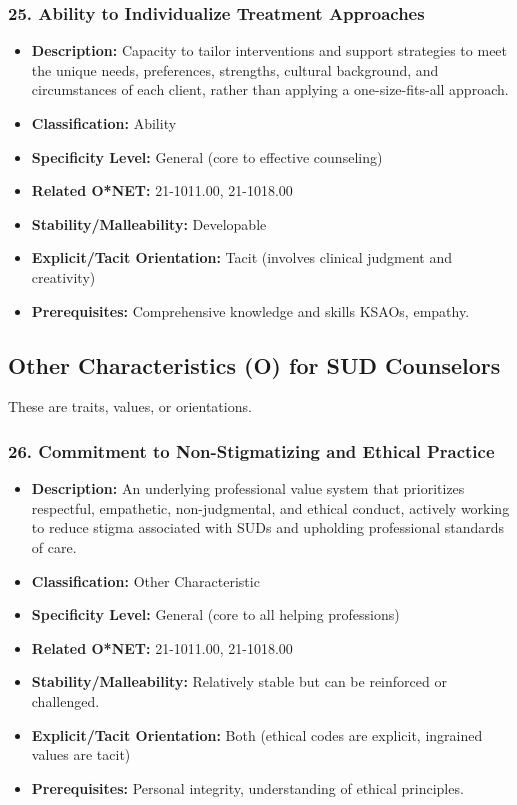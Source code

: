 \documentclass[
  letterpaper,
  DIV=11,
  numbers=noendperiod]{scrartcl}
\providecommand{\tightlist}{%
  \setlength{\itemsep}{0pt}\setlength{\parskip}{0pt}}
\begin{document}
\subsubsection{25. Ability to Individualize Treatment
Approaches}\label{ability-to-individualize-treatment-approaches}

\begin{itemize}
\tightlist
\item
  \textbf{Description:} Capacity to tailor interventions and support
  strategies to meet the unique needs, preferences, strengths, cultural
  background, and circumstances of each client, rather than applying a
  one-size-fits-all approach.
\item
  \textbf{Classification:} Ability
\item
  \textbf{Specificity Level:} General (core to effective counseling)
\item
  \textbf{Related O*NET:} 21-1011.00, 21-1018.00
\item
  \textbf{Stability/Malleability:} Developable
\item
  \textbf{Explicit/Tacit Orientation:} Tacit (involves clinical judgment
  and creativity)
\item
  \textbf{Prerequisites:} Comprehensive knowledge and skills KSAOs,
  empathy.
\end{itemize}

\subsection{Other Characteristics (O) for SUD
Counselors}\label{other-characteristics-o-for-sud-counselors}

These are traits, values, or orientations.

\subsubsection{26. Commitment to Non-Stigmatizing and Ethical
Practice}\label{commitment-to-non-stigmatizing-and-ethical-practice}

\begin{itemize}
\tightlist
\item
  \textbf{Description:} An underlying professional value system that
  prioritizes respectful, empathetic, non-judgmental, and ethical
  conduct, actively working to reduce stigma associated with SUDs and
  upholding professional standards of care.
\item
  \textbf{Classification:} Other Characteristic
\item
  \textbf{Specificity Level:} General (core to all helping professions)
\item
  \textbf{Related O*NET:} 21-1011.00, 21-1018.00
\item
  \textbf{Stability/Malleability:} Relatively stable but can be
  reinforced or challenged.
\item
  \textbf{Explicit/Tacit Orientation:} Both (ethical codes are explicit,
  ingrained values are tacit)
\item
  \textbf{Prerequisites:} Personal integrity, understanding of ethical
  principles.
\end{itemize}
\end{document}
